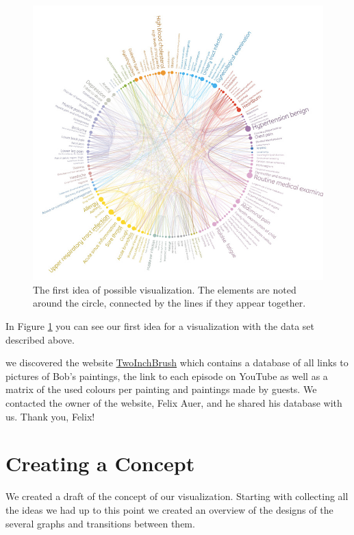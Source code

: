 \documentclass[a4paper]{tufte-book}
\begin{document}
\begin{figure}
	\includegraphics{Images/visualization_first_idea.jpg}
	\caption{The first idea of possible visualization. The elements are noted around the circle, connected by the lines if they appear together.}
	\label{fig:firstidea}
\end{figure}

In Figure \ref{fig:firstidea}\cite{firstidea} you can see our first idea for a visualization with the data set described above.

 we discovered the website \href{http://www.twoinchbrush.com/}{TwoInchBrush} which contains a database of all links to pictures of Bob's paintings, the link to each episode on YouTube as well as a matrix of the used colours per painting and paintings made by guests. We contacted the owner of the website, Felix Auer, and he shared his database\cite{felixauer} with us. Thank you, Felix!\\


\chapter{Creating a Concept}

We created a draft of the concept of our visualization. Starting with collecting all the ideas we had up to this point we created an overview of the designs of the several graphs and transitions between them. 
\end{document}
